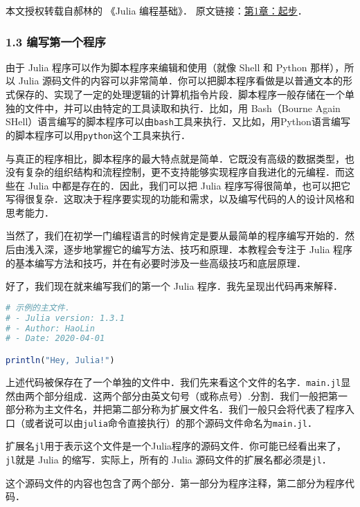 
本文授权转载自郝林的 《Julia 编程基础》． 原文链接：\href{https://github.com/hyper0x/JuliaBasics/blob/master/book/ch01.md}{第1章：起步}．


\subsubsection{1.3 编写第一个程序}

由于 Julia 程序可以作为脚本程序来编辑和使用（就像 Shell 和 Python 那样），所以 Julia 源码文件的内容可以非常简单．你可以把脚本程序看做是以普通文本的形式保存的、实现了一定的处理逻辑的计算机指令片段．脚本程序一般存储在一个单独的文件中，并可以由特定的工具读取和执行．比如，用 Bash（Bourne Again SHell）语言编写的脚本程序可以由\verb|bash|工具来执行．又比如，用Python语言编写的脚本程序可以用\verb|python|这个工具来执行．

与真正的程序相比，脚本程序的最大特点就是简单．它既没有高级的数据类型，也没有复杂的组织结构和流程控制，更不支持能够实现程序自我进化的元编程．而这些在 Julia 中都是存在的．因此，我们可以把 Julia 程序写得很简单，也可以把它写得很复杂．这取决于程序要实现的功能和需求，以及编写代码的人的设计风格和思考能力．

当然了，我们在初学一门编程语言的时候肯定是要从最简单的程序编写开始的．然后由浅入深，逐步地掌握它的编写方法、技巧和原理．本教程会专注于 Julia 程序的基本编写方法和技巧，并在有必要时涉及一些高级技巧和底层原理．

好了，我们现在就来编写我们的第一个 Julia 程序．我先呈现出代码再来解释．

\begin{lstlisting}[language=julia]
# 示例的主文件．
# - Julia version: 1.3.1
# - Author: HaoLin
# - Date: 2020-04-01

println("Hey, Julia!")
\end{lstlisting}

上述代码被保存在了一个单独的文件中．我们先来看这个文件的名字．\verb|main.jl|显然由两个部分组成．这两个部分由英文句号（或称点号）.分割．我们一般把第一部分称为主文件名，并把第二部分称为扩展文件名．我们一般只会将代表了程序入口（或者说可以由\verb|julia|命令直接执行）的那个源码文件命名为\verb|main.jl|．

扩展名\verb|jl|用于表示这个文件是一个Julia程序的源码文件．你可能已经看出来了，\verb|jl|就是 Julia 的缩写．实际上，所有的 Julia 源码文件的扩展名都必须是\verb|jl|．

这个源码文件的内容也包含了两个部分．第一部分为程序注释，第二部分为程序代码．

